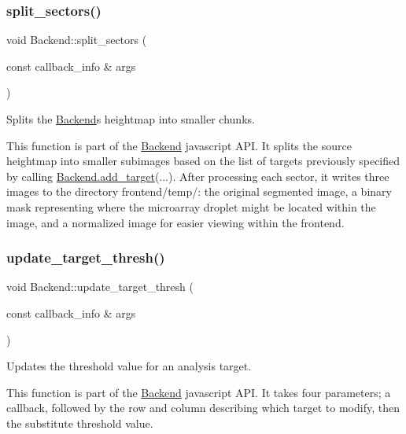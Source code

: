 \subsubsection{\texorpdfstring{split\+\_\+sectors()}{split\_sectors()}}
{\footnotesize\ttfamily void Backend\+::split\+\_\+sectors (\begin{DoxyParamCaption}\item[{const callback\+\_\+info \&}]{args }\end{DoxyParamCaption})\hspace{0.3cm}{\ttfamily [static]}}



Splits the \hyperlink{class_backend}{Backend}\textquotesingle{}s heightmap into smaller chunks. 

This function is part of the \hyperlink{class_backend}{Backend} javascript A\+PI. It splits the source heightmap into smaller subimages based on the list of targets previously specified by calling \hyperlink{class_backend_ad8eb1ddd04ee12fe1e720b09b4fc4c4e}{Backend.\+add\+\_\+target}(...). After processing each sector, it writes three images to the directory frontend/temp/\+: the original segmented image, a binary mask representing where the microarray droplet might be located within the image, and a normalized image for easier viewing within the frontend. \mbox{\label{class_backend_ad2db57d3d4eb38bfda56212c8465ca8a}} 
\subsubsection{\texorpdfstring{update\+\_\+target\+\_\+thresh()}{update\_target\_thresh()}}
{\footnotesize\ttfamily void Backend\+::update\+\_\+target\+\_\+thresh (\begin{DoxyParamCaption}\item[{const callback\+\_\+info \&}]{args }\end{DoxyParamCaption})\hspace{0.3cm}{\ttfamily [static]}}



Updates the threshold value for an analysis target. 

This function is part of the \hyperlink{class_backend}{Backend} javascript A\+PI. It takes four parameters; a callback, followed by the row and column describing which target to modify, then the substitute threshold value. \mbox{\label{class_backend_a2bc5c7f6eb7a1c6ec5b5572410c4e81e}} 
